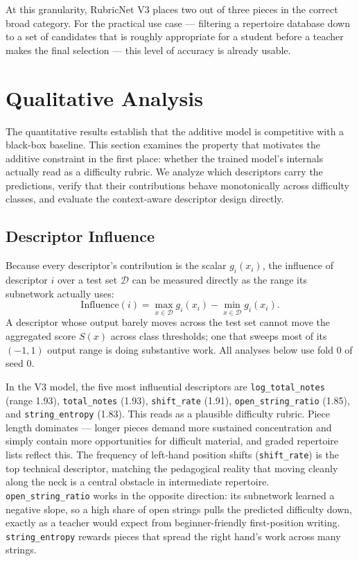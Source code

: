 At this granularity, RubricNet V3 places two out of three pieces in the correct broad category. For the practical use case --- filtering a repertoire database down to a set of candidates that is roughly appropriate for a student before a teacher makes the final selection --- this level of accuracy is already usable.

\section{Qualitative Analysis}
\label{sec:qualitative}
The quantitative results establish that the additive model is competitive with a black-box baseline. This section examines the property that motivates the additive constraint in the first place: whether the trained model's internals actually read as a difficulty rubric. We analyze which descriptors carry the predictions, verify that their contributions behave monotonically across difficulty classes, and evaluate the context-aware descriptor design directly.

\subsection{Descriptor Influence}
\label{sec:influence}
Because every descriptor's contribution is the scalar $g_i(x_i)$, the influence of descriptor $i$ over a test set $\mathcal{D}$ can be measured directly as the range its subnetwork actually uses:
\begin{equation}
    \mathrm{Influence}(i) = \max_{x \in \mathcal{D}} g_i(x_i) - \min_{x \in \mathcal{D}} g_i(x_i).
\end{equation}
A descriptor whose output barely moves across the test set cannot move the aggregated score $S(x)$ across class thresholds; one that sweeps most of its $(-1, 1)$ output range is doing substantive work. All analyses below use fold 0 of seed 0.

In the V3 model, the five most influential descriptors are \texttt{log\_total\_notes} (range 1.93), \texttt{total\_notes} (1.93), \texttt{shift\_rate} (1.91), \texttt{open\_string\_ratio} (1.85), and \texttt{string\_entropy} (1.83). This reads as a plausible difficulty rubric. Piece length dominates --- longer pieces demand more sustained concentration and simply contain more opportunities for difficult material, and graded repertoire lists reflect this. The frequency of left-hand position shifts (\texttt{shift\_rate}) is the top technical descriptor, matching the pedagogical reality that moving cleanly along the neck is a central obstacle in intermediate repertoire. \texttt{open\_string\_ratio} works in the opposite direction: its subnetwork learned a negative slope, so a high share of open strings pulls the predicted difficulty down, exactly as a teacher would expect from beginner-friendly first-position writing. \texttt{string\_entropy} rewards pieces that spread the right hand's work across many strings.

